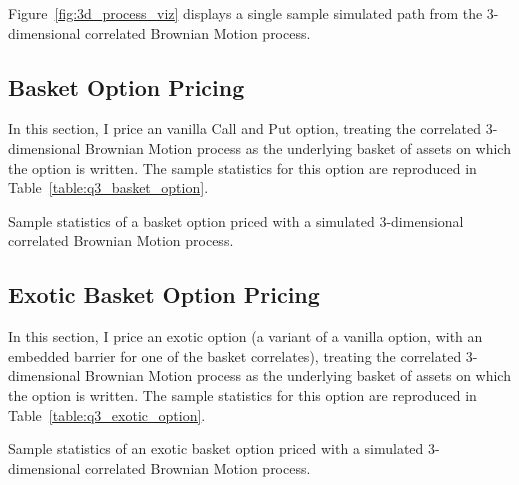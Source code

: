 \documentclass[10pt]{article}
\begin{document}
Figure~\ref{fig:3d_process_viz} displays a single sample simulated path from the 3-dimensional correlated Brownian Motion process.

\newpage
\subsection{Basket Option Pricing}

In this section, I price an vanilla Call and Put option, treating the correlated 3-dimensional Brownian Motion process as the underlying basket of assets on which the option is written. The sample statistics for this option are reproduced in Table~\ref{table:q3_basket_option}.

\begin{table}[!h]
    \centering
    \caption{Sample statistics of a basket option priced with a simulated 3-dimensional correlated Brownian Motion process.}
    \label{table:q3_basket_option}
\end{table}

\subsection{Exotic Basket Option Pricing}

In this section, I price an exotic option (a variant of a vanilla option, with an embedded barrier for one of the basket correlates), treating the correlated 3-dimensional Brownian Motion process as the underlying basket of assets on which the option is written. The sample statistics for this option are reproduced in Table~\ref{table:q3_exotic_option}.

\begin{table}[!h]
    \centering
    \caption{Sample statistics of an exotic basket option priced with a simulated 3-dimensional correlated Brownian Motion process.}
    \label{table:q3_exotic_option}
\end{table}


\newpage

\nocite{Shreve2004}
\nocite{Stefanica2011}
\nocite{Weerawarana2016}
\nocite{Florescu2019}

\printbibliography

\end{document}
